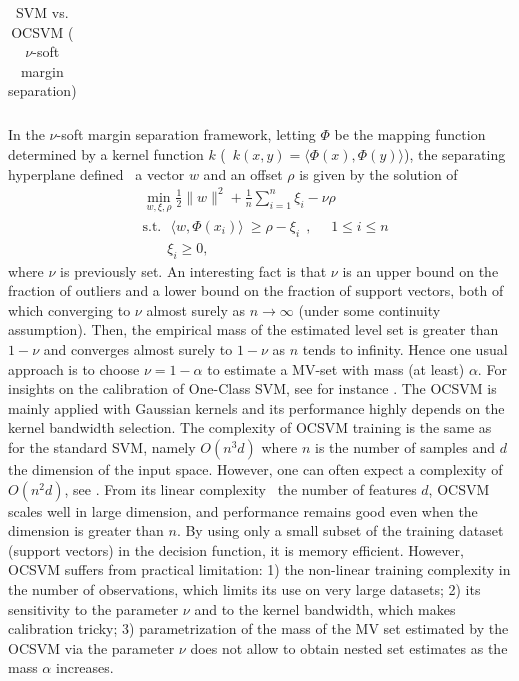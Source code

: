 \begin{table}[!ht]
\begin{tabular}{|c|c|}
              
  \end{tabular}
  \caption{SVM vs. OCSVM ($\nu$-soft margin separation)}
  \label{table:OCSVM-soft}
\end{table}

In the $\nu$-soft margin separation framework, letting $\Phi$ be the mapping function determined by a kernel function $k$ (\ie~$k(x,y) = \langle \Phi(x), \Phi(y)\rangle$), the separating hyperplane defined \wrt~a vector $w$ and an offset $\rho$ is given by the solution of 
\begin{align*}
&\min_{w,\xi,\rho} \frac{1}{2} \|w\|^2 + \frac{1}{n} \sum_{i=1}^n \xi_i - \nu \rho\\
&\text{s.t.}~~~ \langle w, \Phi(x_i)\rangle ~\ge \rho - \xi_i~~,~~~~~~1 \le i \le n \\
& ~~~~~~~~\xi_i \ge 0,
\end{align*}
where $\nu$ is previously set. An interesting fact is that $\nu$ is an upper bound on the fraction of outliers and a lower bound on the fraction of support vectors, both of which converging to $\nu$ almost surely as $n \to \infty$ (under some continuity assumption). Then, the empirical mass of the estimated level set is greater than $1-\nu$ and converges almost surely to $1-\nu$ as $n$ tends to infinity. Hence one usual approach is to choose $\nu = 1 - \alpha$ to estimate a MV-set with mass (at least) $\alpha$. For insights on the calibration of One-Class SVM, see for instance \cite{Thomas2015}.
%
The OCSVM is mainly applied with Gaussian kernels and its performance highly depends on the kernel bandwidth selection.
The complexity of OCSVM training is the same as for the standard SVM, namely $O(n^3 d)$ where $n$ is the number of samples and $d$ the dimension of the input space. However, one can often expect a complexity of $O(n^2 d)$, see \cite{Bottou2007}. From its linear complexity \wrt~the number of features $d$, OCSVM scales well in large dimension, and performance remains good even when the dimension is greater than $n$. By using only a small subset of the training dataset (support vectors) in the decision function, it is memory efficient. However, OCSVM suffers from practical limitation: 1) the non-linear training complexity in the number of observations, which limits its use on very large datasets; 2) its sensitivity to the parameter $\nu$ and to the kernel bandwidth, which makes calibration tricky; 3) parametrization of the mass of the MV set estimated by the OCSVM via the parameter $\nu$ does not allow to obtain nested set estimates as the mass $\alpha$ increases.

